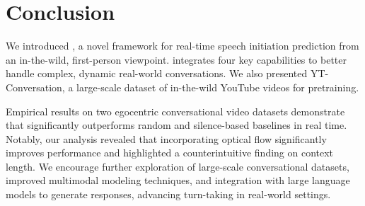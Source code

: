 
\section{Conclusion}\label{sec:conclusion}
We introduced \frameworkname, a novel framework for real-time speech initiation prediction from an in-the-wild, first-person viewpoint. \frameworkname integrates four key capabilities to better handle complex, dynamic real-world conversations. We also presented YT-Conversation, a large-scale dataset of in-the-wild YouTube videos for pretraining.

Empirical results on two egocentric conversational video datasets demonstrate that \frameworkname significantly outperforms random and silence-based baselines in real time. Notably, our analysis revealed that incorporating optical flow significantly improves performance and highlighted a counterintuitive finding on context length. We encourage further exploration of large-scale conversational datasets, improved multimodal modeling techniques, and integration with large language models to generate responses, advancing turn-taking in real-world settings.




